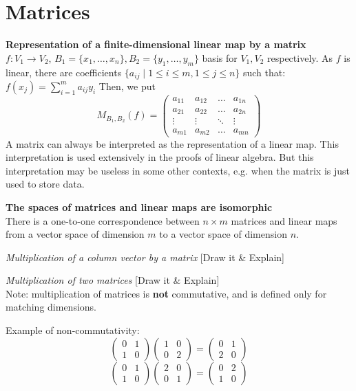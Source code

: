 \chapter{Matrices}
\textbf{Representation of a finite-dimensional linear map by a matrix}\\
$f:V_1 \to V_2$, $B_1=\{x_1,\dots,x_n\},B_2=\{y_1,\dots,y_m\}$ basis for $V_1,V_2$ respectively.
As $f$ is linear, there are coefficients $\{a_{ij} \mid 1 \leq i \leq m, 1 \leq j \leq n\}$ such that: $f(x_j)=\sum_{i=1}^{m}a_{ij}y_i$
Then, we put 
$$
M_{B_1,B_2}(f)=
\begin{pmatrix}
	a_{11} & a_{12} & \dots  & a_{1n} \\
	a_{21} & a_{22} & \dots  & a_{2n} \\
	\vdots & \vdots & \ddots & \vdots \\
	a_{m1} & a_{m2} & \dots  & a_{mn}
\end{pmatrix}
$$
A matrix can always be interpreted as the representation of a linear map. This interpretation is used extensively in the proofs of linear algebra. But this interpretation may be useless in some other contexts, e.g. when the matrix is just used to store data.

\textbf{The spaces of matrices and linear maps are isomorphic}\\
There is a one-to-one correspondence between $n \times m$ matrices and linear maps from a vector space of dimension $m$ to a vector space of dimension $n$.

\textit{Multiplication of a column vector by a matrix}
[Draw it \& Explain]

\textit{Multiplication of two matrices}
[Draw it \& Explain]\\
Note: multiplication of matrices is \textbf{not} commutative, and is defined only for matching dimensions.

Example of non-commutativity:
$$
\begin{pmatrix}
	0&1\\
	1&0
\end{pmatrix}
\begin{pmatrix}
	1&0\\
	0&2
\end{pmatrix}
=
\begin{pmatrix}
	0&1\\
	2&0
\end{pmatrix}
$$
$$
\begin{pmatrix}
	0&1\\
	1&0
\end{pmatrix}
\begin{pmatrix}
	2&0\\
	0&1
\end{pmatrix}
=
\begin{pmatrix}
	0&2\\
	1&0
\end{pmatrix}
$$

